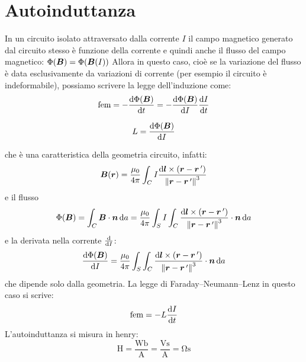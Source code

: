 \section{Autoinduttanza}
In un circuito isolato attraversato dalla corrente $I$ il campo magnetico generato dal circuito stesso è funzione della corrente e quindi anche il flusso del campo magnetico: $\Phi(\boldsymbol{B})=\Phi(\boldsymbol{B}(I))$
Allora in questo caso, cioè se la variazione del flusso è data esclusivamente da variazioni di corrente (per esempio il circuito è indeformabile), possiamo scrivere la legge dell'induzione come:
\begin{equation}
  \text{fem}=-\frac{\mathrm{d}\Phi(\boldsymbol{B})}{\mathrm{d} t}=-\frac{\mathrm{d}\Phi(\boldsymbol{B})}{\mathrm{d} I}\frac{\mathrm{d} I}{\mathrm{d} t}
\end{equation}
\begin{Def}
  \begin{equation}
    L=\frac{\mathrm{d}\Phi(\boldsymbol{B})}{\mathrm{d} I}
  \end{equation}
\end{Def}
che è una caratteristica della geometria circuito, infatti:
\[
  \boldsymbol{B}(\boldsymbol{r})=\frac{\mu_0}{4\pi}\int_C I\frac{\mathrm{d} \boldsymbol{l}\times\left(\boldsymbol{r}-\boldsymbol{r}\,'\right)}{\left\lVert\boldsymbol{r}-\boldsymbol{r}\,'\right\rVert^3}
\]
e il flusso
\[
  \Phi(\boldsymbol{B})=\int_C \boldsymbol{B}\cdot\boldsymbol{n}\,\mathrm{d} a = \frac{\mu_0}{4\pi}\int_S I\int_C\frac{\mathrm{d} \boldsymbol{l}\times\left(\boldsymbol{r}-\boldsymbol{r}\,'\right)}{\left\lVert\boldsymbol{r}-\boldsymbol{r}\,'\right\rVert^3}\cdot \boldsymbol{n}\,\mathrm{d} a
\]
e la derivata nella corrente $\frac{\mathrm{d}}{\mathrm{d} I}$:
\[
  \frac{\mathrm{d}\Phi(\boldsymbol{B})}{\mathrm{d} I}=\frac{\mu_0}{4\pi}\int_S\int_C\frac{\mathrm{d} \boldsymbol{l}\times\left(\boldsymbol{r}-\boldsymbol{r}\,'\right)}{\left\lVert\boldsymbol{r}-\boldsymbol{r}\,'\right\rVert^3}\cdot \boldsymbol{n}\,\mathrm{d} a
\]
che dipende solo dalla geometria. La legge di Faraday--Neumann--Lenz in questo caso si scrive:
\begin{equation}
  \text{fem}=-L\frac{\mathrm{d} I}{\mathrm{d} t}
\end{equation}
L'autoinduttanza si misura in henry:
\[
  \si{\henry}=\frac{\si{\weber}}{\si{\ampere}}=\frac{\si{\volt\second}}{\si{\ampere}}=\si{\ohm\second}
\]
